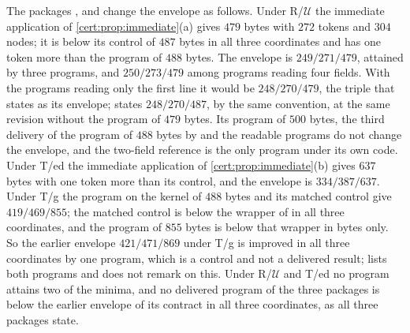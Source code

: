 The packages ,  and
 change the envelope as follows. Under
R/$\mathcal U$ the immediate application of \cref{cert:prop:immediate}(a)
gives $479$ bytes with $272$ tokens and $304$ nodes; it is below its control
of $487$ bytes in all three coordinates and has one token more than the
program of $488$ bytes. The envelope is $249/271/479$, attained by three
programs, and $250/273/479$ among programs reading four fields. With the
programs reading only the first line it would be $248/270/479$, the triple
that  states as its envelope;
 states $248/270/487$, by the same convention, at
the same revision without the program of $479$ bytes. Its program of $500$
bytes, the third delivery of the program of $488$ bytes by 
and the readable programs do not
change the envelope, and the two-field reference is the only program under
its own code. Under T/ed the immediate application of
\cref{cert:prop:immediate}(b) gives $637$ bytes with one token more than its
control, and the envelope is $334/387/637$. Under T/g the program on the
kernel of $488$ bytes and its matched control give $419/469/855$; the matched
control is below the wrapper of  in all three
coordinates, and the program of $855$ bytes is below that wrapper in bytes
only. So the earlier envelope $421/471/869$ under T/g is improved in all three
coordinates by one program, which is a control and not a delivered result;
 lists both programs and does not remark on this. Under
R/$\mathcal U$ and T/ed no program attains two of the minima, and no
delivered program of the three packages is below the earlier envelope of its
contract in all three coordinates, as all three packages state.

